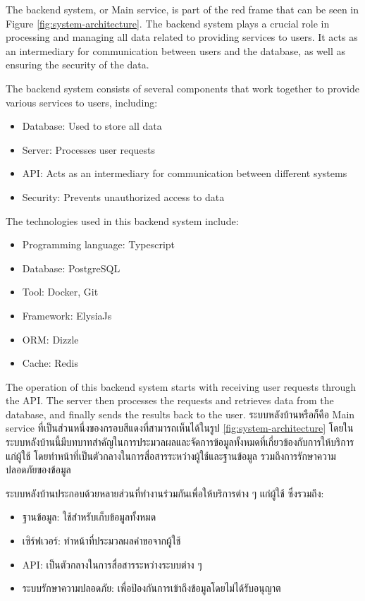 \ifenglish
The backend system, or Main service, is part of the red frame that can be seen in Figure \ref{fig:system-architecture}. The backend system plays a crucial role in processing and managing all data related to providing services to users. It acts as an intermediary for communication between users and the database, as well as ensuring the security of the data.

The backend system consists of several components that work together to provide various services to users, including:
\begin{itemize}
    \item Database: Used to store all data
    \item Server: Processes user requests
    \item API: Acts as an intermediary for communication between different systems
    \item Security: Prevents unauthorized access to data
\end{itemize}

The technologies used in this backend system include:
\begin{itemize}
    \item Programming language: Typescript
    \item Database: PostgreSQL
    \item Tool: Docker, Git
    \item Framework: ElysiaJs
    \item ORM: Dizzle
    \item Cache: Redis
\end{itemize}

The operation of this backend system starts with receiving user requests through the API. The server then processes the requests and retrieves data from the database, and finally sends the results back to the user.
\else 
ระบบหลังบ้านหรือก็คือ Main service ที่เป็นส่วนหนึ่งของกรอบสีแดงที่สามารถเห็นได้ในรูป \ref{fig:system-architecture} โดยในระบบหลังบ้านนี้มีบทบาทสำคัญในการประมวลผลและจัดการข้อมูลทั้งหมดที่เกี่ยวข้องกับการให้บริการแก่ผู้ใช้ โดยทำหน้าที่เป็นตัวกลางในการสื่อสารระหว่างผู้ใช้และฐานข้อมูล รวมถึงการรักษาความปลอดภัยของข้อมูล

ระบบหลังบ้านประกอบด้วยหลายส่วนที่ทำงานร่วมกันเพื่อให้บริการต่าง ๆ แก่ผู้ใช้ ซึ่งรวมถึง:
\begin{itemize}
    \item ฐานข้อมูล: ใช้สำหรับเก็บข้อมูลทั้งหมด
    \item เซิร์ฟเวอร์: ทำหน้าที่ประมวลผลคำขอจากผู้ใช้
    \item API: เป็นตัวกลางในการสื่อสารระหว่างระบบต่าง ๆ
    \item ระบบรักษาความปลอดภัย: เพื่อป้องกันการเข้าถึงข้อมูลโดยไม่ได้รับอนุญาต
\end{itemize}

